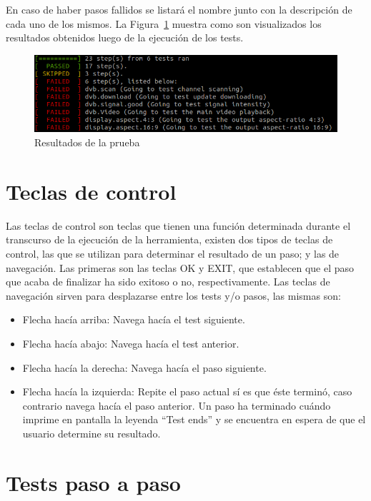 \documentclass{article}
\begin{document}
En caso de haber pasos fallidos se listará el nombre junto con la descripción de cada uno de los mismos.
La Figura~\ref{fig:results} muestra como son visualizados los resultados obtenidos luego de la ejecución de los tests.

\begin{figure}[h!]
\includegraphics[scale=0.50]{testresults}
\caption{Resultados de la prueba}
\label{fig:results}
\end{figure}

\FloatBarrier

\section{Teclas de control}
\label{sec:control_keys}
Las teclas de control son teclas que tienen una función determinada durante el transcurso de la ejecución de la herramienta, existen dos tipos de teclas de control, las que se utilizan para determinar el resultado de un paso; y las de navegación. Las primeras son las teclas OK y EXIT, que establecen que el paso que acaba de finalizar ha sido exitoso o no, respectivamente. 
Las teclas de navegación sirven para desplazarse entre los tests y/o pasos, las mismas son:

\begin{itemize}
	\item Flecha hacía arriba: Navega hacía el test siguiente.
	\item Flecha hacía abajo: Navega hacía el test anterior.
	\item Flecha hacía la derecha: Navega hacía el paso siguiente.
	\item Flecha hacía la izquierda: Repite el paso actual sí es que éste terminó, caso contrario navega hacía el paso anterior. Un paso ha terminado cuándo imprime en pantalla la leyenda ``Test ends'' y se encuentra en espera de que el usuario determine su resultado.
\end{itemize}

\section{Tests paso a paso}
\label{sec:tests}
\end{document}
